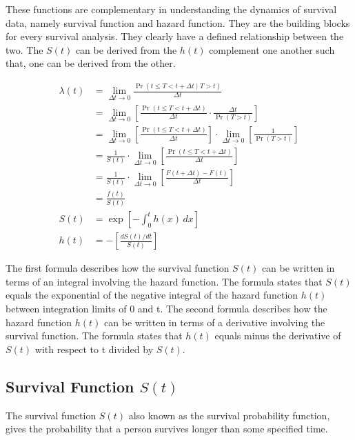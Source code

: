 \documentclass[doublespacing]{report} %
\begin{document}
These functions are complementary in understanding the dynamics of survival data, namely survival function and hazard function. They are the building blocks for every survival analysis. They clearly have a defined relationship between the two. The \(S\left(t\right)\) can be derived from the \(h\left(t\right)\) complement one another such that, one can be derived from the other.

\begin{align}
\lambda(t) &= \lim_{\Delta t \to 0} \frac{\Pr(t \leq T < t + \Delta t \mid T > t)}{\Delta t} \\
&= \lim_{\Delta t \to 0} \left[ \frac{\Pr(t \leq T < t + \Delta t)}{\Delta t} \cdot \frac{\Delta t}{\Pr(T > t)} \right] \\
&= \lim_{\Delta t \to 0} \left[ \frac{\Pr(t \leq T < t + \Delta t)}{\Delta t} \right] \cdot \lim_{\Delta t \to 0} \left[ \frac{1}{\Pr(T > t)} \right] \\
&= \frac{1}{S(t)} \cdot \lim_{\Delta t \to 0} \left[ \frac{\Pr(t \leq T < t + \Delta t)}{\Delta t} \right] \\
&= \frac{1}{S(t)} \cdot \lim_{\Delta t \to 0} \left[ \frac{F(t + \Delta t) - F(t)}{\Delta t} \right] \\
&= \frac{f(t)}{S(t)}\\
S(t) &= \exp\left[-\int_{0}^{t} h(x) \, dx\right]\\
h(t) &= -\left[\frac{dS(t)/dt}{S(t)}\right]
\end{align}



The first formula describes how the survival function \(S\left(t\right)\) can be written in terms of an integral involving the hazard function. The formula states that \(S\left(t\right) \)equals the exponential of the negative integral of the hazard function \(h\left(t\right) \) between integration limits of 0 and t. 
The second formula describes how the hazard function \(h\left(t\right) \) can be written in terms of a derivative involving the survival function. The formula states that \( h\left(t\right)\) equals minus the derivative of \(S\left(t\right) \) with respect to t divided by \(S\left(t\right)\).


\subsection{\texorpdfstring{Survival Function \( S(t) \)}{Survival Function S(t)}}
The survival function \(S\left(t\right) \) also known as the survival probability function, gives the probability that a person survives longer than some specified time.
\end{document}
